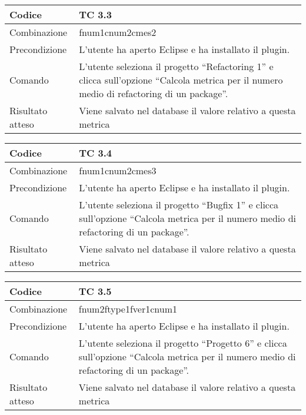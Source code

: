 \begin{table}[ht]
\begin{tabular}{|p{3cm}|p{9cm}|}
\hline
\cellcolor{lightgray}Codice				& TC 3.3								\\
\hline
\cellcolor{lightgray}Combinazione		& fnum1cnum2cmes2									\\
\hline
\cellcolor{lightgray}Precondizione		& L'utente ha aperto Eclipse e ha installato il plugin.					\\
\hline
\cellcolor{lightgray}Comando			& L'utente seleziona il progetto ``Refactoring 1''  e clicca sull'opzione ``Calcola metrica per il numero medio di refactoring di un package''.	\\
\hline
\cellcolor{lightgray}Risultato atteso	& Viene salvato nel database il valore relativo a questa metrica	\\
\hline
\end{tabular}
\end{table}

\begin{table}[ht]
\begin{tabular}{|p{3cm}|p{9cm}|}
\hline
\cellcolor{lightgray}Codice				& TC 3.4								\\
\hline
\cellcolor{lightgray}Combinazione		& fnum1cnum2cmes3									\\
\hline
\cellcolor{lightgray}Precondizione		& L'utente ha aperto Eclipse e ha installato il plugin.			\\
\hline
\cellcolor{lightgray}Comando			& L'utente seleziona il progetto ``Bugfix 1''  e clicca sull'opzione ``Calcola metrica per il numero medio di refactoring di un package''.	\\
\hline
\cellcolor{lightgray}Risultato atteso	& Viene salvato nel database il valore relativo a questa metrica	\\
\hline
\end{tabular}
\end{table}

\begin{table}[ht]
\begin{tabular}{|p{3cm}|p{9cm}|}
\hline
\cellcolor{lightgray}Codice				& TC 3.5								\\
\hline
\cellcolor{lightgray}Combinazione		& fnum2ftype1fver1cnum1 									\\
\hline
\cellcolor{lightgray}Precondizione		& L'utente ha aperto Eclipse e ha installato il plugin.			\\
\hline
\cellcolor{lightgray}Comando			& L'utente seleziona il progetto ``Progetto 6''  e clicca sull'opzione ``Calcola metrica per il numero medio di refactoring di un package''.	\\
\hline
\cellcolor{lightgray}Risultato atteso	& Viene salvato nel database il valore relativo a questa metrica	\\
\hline
\end{tabular}
\end{table}

